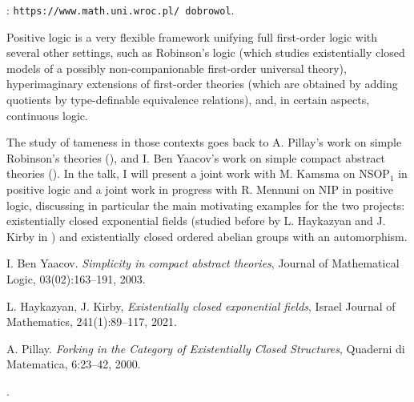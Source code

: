 \documentclass[bsl,meeting]{asl}
\def\urladdr#1{\endgraf\noindent{\it URL Address}: {\tt #1}.}
\newcommand{\NP}{}
\begin{document}
\thispagestyle{empty}


\NP%
%
%
%
%
\urladdr{https://www.math.uni.wroc.pl/\string~dobrowol}


Positive logic is a very flexible framework unifying full first-order logic with several other settings, such as Robinson's logic (which studies existentially closed models of a possibly non-companionable first-order universal theory), hyperimaginary extensions of first-order theories (which are obtained by adding quotients by type-definable equivalence relations), and, in certain aspects, continuous logic.

The study of tameness in those contexts goes back to A. Pillay's work on simple Robinson's theories (\cite{Pi}), and I. Ben Yaacov's work on simple compact abstract theories (\cite{BY}). In the talk, I will present a joint work with M. Kamsma on NSOP$_1$ in positive logic and a joint work in progress with R. Mennuni on NIP in positive logic, discussing in particular the main motivating examples for the two projects: existentially closed exponential fields (studied before by L. Haykazyan and J. Kirby in \cite{HK}) and existentially closed ordered abelian groups with an automorphism.



\begin{thebibliography}{99}

 I. Ben Yaacov.
{\em Simplicity in compact abstract theories}, Journal of Mathematical Logic, 03(02):163–191, 2003.

 L. Haykazyan, J. Kirby,
{\em Existentially closed exponential fields}, 
Israel
Journal of Mathematics, 241(1):89–117, 2021.


 A. Pillay.
{\em Forking in the Category of Existentially Closed Structures}, Quaderni di
Matematica, 6:23–42, 2000.

.
\end{thebibliography}
\end{document}
